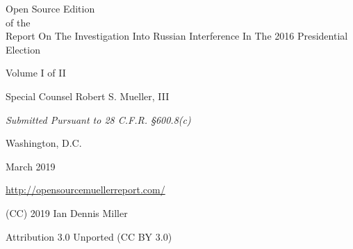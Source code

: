 \thispagestyle{empty}

\begin{center}
\Huge
Open Source Edition \\
of the \\
Report On The Investigation Into Russian Interference In The 2016 Presidential Election

\vspace{10 mm}

\large
Volume I of II

\vspace{10 mm}

Special Counsel Robert S. Mueller, III

\vspace{10 mm}

\normalsize

\textit{Submitted Pursuant to 28 C.F.R. \S 600.8(c)}

\vspace{20 mm}

Washington, D.C.

\vspace{10 mm}

March 2019

\vspace{10 mm}

\large
\url{http://opensourcemuellerreport.com/}

\vspace{10 mm}

\normalsize
(CC) 2019 Ian Dennis Miller

Attribution 3.0 Unported (CC BY 3.0)

\end{center}

\newpage
